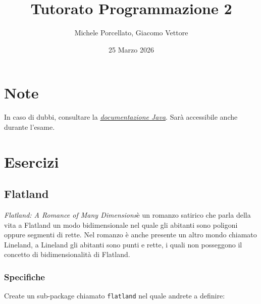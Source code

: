 \documentclass{article}
\title{Tutorato Programmazione 2}
\author{Michele Porcellato, Giacomo Vettore}
\date{25 Marzo 2026}
\begin{document}
\maketitle

\section{Note}
In caso di dubbi, consultare la \href{https://docs.oracle.com/en/java/javase/25/docs/api/index.html}{\textit{documentazione Java}}. Sarà accessibile anche durante l'esame.

\section{Esercizi}

\subsection{Flatland}

\textit{Flatland: A Romance of Many Dimensions}\footnotemark è un romanzo satirico che parla della vita a Flatland un modo bidimensionale nel quale gli abitanti sono poligoni oppure segmenti di rette. Nel romanzo è anche presente un altro mondo chiamato Lineland, a Lineland gli abitanti sono punti e rette, i quali non posseggono il concetto di bidimensionalità di Flatland.


\subsubsection{Specifiche}

Create un sub-package chiamato \texttt{flatland} nel quale andrete a definire:
\end{document}
